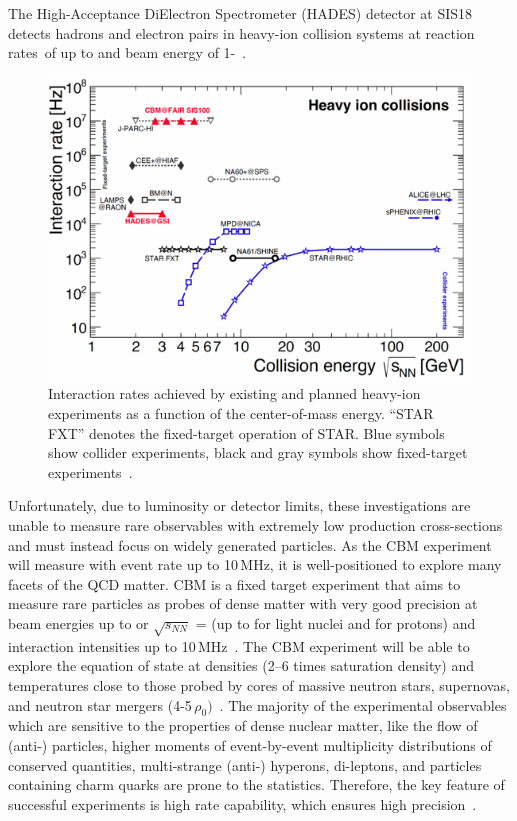 The High-Acceptance DiElectron Spectrometer (\gls{HADES}) detector at SIS18 detects hadrons and electron pairs in heavy-ion collision systems at reaction rates of up to  and beam energy of 1-~\cite{Ablyazimov_2017}.

\begin{figure}[!h]
    \centering
    \includegraphics[width=0.7\columnwidth]{Chapter1/images/interaction_rates.png}
    \caption{Interaction rates achieved by existing and planned heavy-ion experiments as a function of the center-of-mass energy. “STAR FXT” denotes the fixed-target operation of STAR.  Blue symbols show collider experiments, black and gray symbols show fixed-target experiments~\cite{Ablyazimov_2017}.}
    \label{fig:cbm_rates}
\end{figure}
Unfortunately, due to luminosity or detector limits, these investigations are unable to measure rare observables with extremely low production cross-sections and must instead focus on widely generated particles. As the \gls{CBM} experiment will measure with event rate up to 10\,MHz, it is well-positioned to explore many facets of the \gls{QCD} matter. \gls{CBM} is a fixed target experiment that aims to measure rare particles as probes of dense matter with very good precision at beam energies up to  or $\sqrt{s_{NN}}$ =  (up to  for light nuclei and  for protons) and interaction intensities up to 10\,MHz~\cite{cbmus}.
\newpage
The \gls{CBM} experiment will be able to explore the equation of state at densities (2–6 times saturation density) and temperatures close to those probed by cores of massive neutron stars, supernovas, and neutron star mergers (4-5\,$\rho_{0})$~\cite{Senger_2020}. The majority of the experimental observables which are sensitive to the properties of dense nuclear matter, like the flow of (anti-) particles, higher moments of event-by-event multiplicity distributions of conserved quantities, multi-strange (anti-) hyperons, di-leptons, and particles containing charm quarks are prone to the statistics. Therefore, the key feature of successful experiments is high rate capability, which ensures high precision~\cite{Ablyazimov_2017}. 

